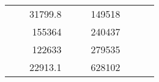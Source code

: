 \begin{table}[H]
\begin{tabular}{|ccrccrccc}
\multicolumn{1}{|c|}{\cellcolor[HTML]{FFFFC7}}                                & \multicolumn{1}{c|}{\cellcolor[HTML]{DDFDFF}}                      & \multicolumn{1}{r|}{\cellcolor[HTML]{DAE8FC}31799.8}   & \multicolumn{1}{c|}{\cellcolor[HTML]{FFFFC7}}                                & \multicolumn{1}{c|}{\cellcolor[HTML]{DDFDFF}}                       & \multicolumn{1}{r|}{\cellcolor[HTML]{DDFDFF}149518}    &                                                                              &                                                                    &                                                        \\ \cline{3-3} \cline{6-6}
\multicolumn{1}{|c|}{\cellcolor[HTML]{FFFFC7}}                                & \multicolumn{1}{c|}{\cellcolor[HTML]{DDFDFF}}                      & \multicolumn{1}{r|}{\cellcolor[HTML]{DDFDFF}155364}    & \multicolumn{1}{c|}{\cellcolor[HTML]{FFFFC7}}                                & \multicolumn{1}{c|}{\cellcolor[HTML]{DDFDFF}}                       & \multicolumn{1}{r|}{\cellcolor[HTML]{DAE8FC}240437}    &                                                                              &                                                                    &                                                        \\ \cline{3-3} \cline{6-6}
\multicolumn{1}{|c|}{\cellcolor[HTML]{FFFFC7}}                                & \multicolumn{1}{c|}{\cellcolor[HTML]{DDFDFF}}                      & \multicolumn{1}{r|}{\cellcolor[HTML]{DAE8FC}122633}    & \multicolumn{1}{c|}{\cellcolor[HTML]{FFFFC7}}                                & \multicolumn{1}{c|}{\cellcolor[HTML]{DDFDFF}}                       & \multicolumn{1}{r|}{\cellcolor[HTML]{DDFDFF}279535}    &                                                                              &                                                                    &                                                        \\ \cline{3-3} \cline{6-6}
\multicolumn{1}{|c|}{\cellcolor[HTML]{FFFFC7}}                                & \multicolumn{1}{c|}{\cellcolor[HTML]{DDFDFF}}                      & \multicolumn{1}{r|}{\cellcolor[HTML]{DDFDFF}22913.1}   & \multicolumn{1}{c|}{\cellcolor[HTML]{FFFFC7}}                                & \multicolumn{1}{c|}{\cellcolor[HTML]{DDFDFF}}                       & \multicolumn{1}{r|}{\cellcolor[HTML]{DAE8FC}628102}    &                                                                              &                                                                    &                                                        \\ \cline{3-3} \cline{6-6}

\end{tabular}
\end{table}
